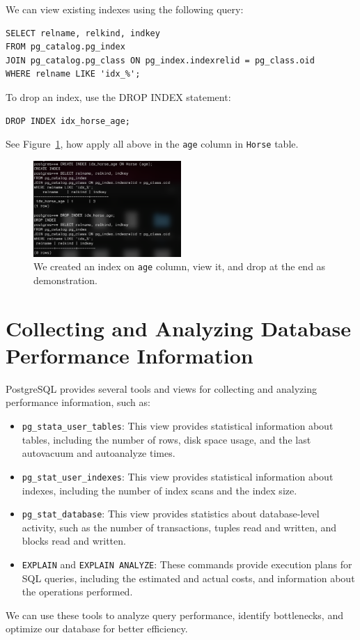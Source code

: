 \documentclass{article}
\def\c#1{\texttt{#1}}
\begin{document}
We can view existing indexes using the following query:
\begin{lstlisting}
SELECT relname, relkind, indkey
FROM pg_catalog.pg_index
JOIN pg_catalog.pg_class ON pg_index.indexrelid = pg_class.oid
WHERE relname LIKE 'idx_%';
\end{lstlisting}

To drop an index, use the DROP INDEX statement:
\begin{lstlisting}
DROP INDEX idx_horse_age;
\end{lstlisting}
See Figure~\ref{fig:create idx}, how apply all above in the \c{age} column in \c{Horse} table.
\begin{figure}
	\begin{center}
		\includegraphics[width=0.5\textwidth]{figures/create_drop_idx.png}
	\end{center}
	\caption{We created an index on \c{age} column, view it, and drop at the end as demonstration.}\label{fig:create idx}
\end{figure}

\section{Collecting and Analyzing Database Performance Information} %
\label{sec:Collecting and Analyzing Database Performance Information}
PostgreSQL provides several tools and views for collecting and analyzing performance information, such as:
\begin{itemize}
	\item \c{pg\_stata\_user\_tables}: This view provides statistical information about tables, including the number of rows, disk space usage, and the last autovacuum and autoanalyze times.
	\item \c{pg\_stat\_user\_indexes}: This view provides statistical information about indexes, including the number of index scans and the index size.
	\item \c{pg\_stat\_database}: This view provides statistics about database-level activity, such as the number of transactions, tuples read and written, and blocks read and written.
	\item \c{EXPLAIN} and \c{EXPLAIN ANALYZE}: These commands provide execution plans for SQL queries, including the estimated and actual costs, and information about the operations performed.
\end{itemize}
We can use these tools to analyze query performance, identify bottlenecks, and optimize our database for better efficiency.
\end{document}
